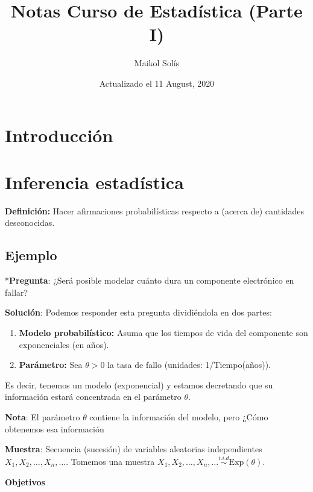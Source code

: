 \documentclass[
  12pt,
]{book}
\title{Notas Curso de Estadística (Parte I)}
\author{Maikol Solís}
\date{Actualizado el 11 August, 2020}
\providecommand{\tightlist}{%
  \setlength{\itemsep}{0pt}\setlength{\parskip}{0pt}}
\begin{document}
\maketitle

{
\hypersetup{linkcolor=}
\setcounter{tocdepth}{4}
\tableofcontents
}
\hypertarget{introducciuxf3n}{%
\chapter{Introducción}\label{introducciuxf3n}}

\hypertarget{inferencia-estaduxedstica}{%
\chapter{Inferencia estadística}\label{inferencia-estaduxedstica}}

\textbf{Definición:} Hacer afirmaciones probabilísticas respecto a (acerca de)
cantidades desconocidas.

\hypertarget{ejemplo}{%
\section{Ejemplo}\label{ejemplo}}

*\textbf{Pregunta}: ¿Será posible modelar cuánto dura un componente electrónico en
fallar?

\textbf{Solución}: Podemos responder esta pregunta dividiéndola en dos partes:

\begin{enumerate}
\def\labelenumi{\arabic{enumi}.}
\tightlist
\item
  \textbf{Modelo probabilístico:} Asuma que los tiempos de vida del componente son
  exponenciales (en años).
\item
  \textbf{Parámetro:} Sea \(\theta > 0\) la tasa de fallo (unidades: 1/Tiempo(años)).
\end{enumerate}

Es decir, tenemos un modelo (exponencial) y estamos decretando que su información estará concentrada en el parámetro \(\theta\).

\textbf{Nota}: El parámetro \(\theta\) contiene la información del modelo,
pero ¿Cómo obtenemos esa información

\textbf{Muestra}: Secuencia (sucesión) de variables aleatorias independientes \(X_1,X_2,\dots, X_n,\dots\). Tomemos una muestra \(X_1,X_2,\dots, X_n,\dots \stackrel{i.i.d}{\sim} \text{Exp}(\theta)\).

\textbf{Objetivos}
\end{document}
